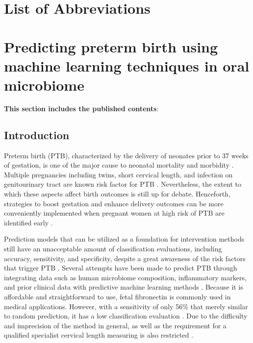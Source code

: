 \documentclass[11pt, a4paper, onecolumn, oneside]{report}
\begin{document}
\listoffigures{}
\thispagestyle{empty}
\clearpage

\listoftables{}
\thispagestyle{empty}
\clearpage

\setcounter{page}{1}

    \section*{\centering List of Abbreviations}
    \printacronyms[display=all, heading=none]
    \newpage

    \section{Predicting preterm birth using machine learning techniques in oral microbiome}
        \label{section:PTB}

        \textbf{This section includes the published contents}: \\
         \nocite{PTB-JW-1}

        \subsection{Introduction}
            Preterm birth (PTB), characterized by the delivery of neonates prior to 37 weeks of gestation, is one of the major cause to neonatal mortality and morbidity \cite{PTB-rate-1}. Multiple pregnancies including twins, short cervical length, and infection on genitourinary tract are known risk factor for PTB \cite{PTB-cause-1}. Nevertheless, the extent to which these aspects affect birth outcomes is still up for debate. Henceforth, strategies to boost gestation and enhance delivery outcomes can be more conveniently implemented when pregnant women at high risk of PTB are identified early \cite{PTB-care-1}.

            Prediction models that can be utilized as a foundation for intervention methods still have an unacceptable amount of classification evaluations, including accuracy, sensitivity, and specificity, despite a great awareness of the risk factors that trigger PTB \cite{PTB-prediction-1}. Several attempts have been made to predict PTB through integrating data such as human microbiome composition, inflammatory markers, and prior clinical data with predictive machine learning methods \cite{PTB-prediction-2}. Because it is affordable and straightforward to use, fetal fibronectin is commonly used in medical applications. However, with a sensitivity of only 56\% that merely similar to random prediction, it has a low classification evaluation \cite{PTB-prediction-3}. Due to the difficulty and imprecision of the method in general, as well as the requirement for a qualified specialist cervical length measuring is also restricted \cite{PTB-prediction-4}.
\end{document}
